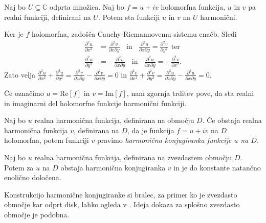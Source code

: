 \documentclass[mat1, tisk]{fmfdelo}
\begin{document}
    \begin{trditev}
        \label{hh}
        Naj bo $U \subseteq \mathbb{C}$ odprta množica. Naj bo $f = u + iv$ holomorfna funkcija, $u$ in $v$ pa realni funkciji, definirani na $U$. Potem sta funkciji $u$ in $v$ na $U$ harmonični.
    \end{trditev}

    \begin{dokaz}
        Ker je $f$ holomorfna, zadošča Cauchy-Riemannovemu sistemu enačb. Sledi
        \begin{align*}
            \frac{\partial^2 u}{\partial x^2} &= \frac{\partial^2 v}{\partial x \partial y}~~~~\text{in}~~~~\frac{\partial^2 u}{\partial x \partial y} = \frac{\partial^2 v}{\partial y^2}~~\text{ter}\\ 
            \frac{\partial^2 u}{\partial y^2} &=  - \frac{\partial^2 v}{\partial x \partial y}~~~~\text{in}~~~~\frac{\partial^2 u}{\partial x \partial y} =  - \frac{\partial^2 v}{\partial x^2}.
        \end{align*}
        Zato velja $\frac{\partial^2 u}{\partial x^2} + \frac{\partial^2 u}{\partial y^2} = \frac{\partial^2 v}{\partial x \partial y} - \frac{\partial^2 v}{\partial x \partial y} =0$ in $\frac{\partial^2 v}{\partial x^2} + \frac{\partial^2 v}{\partial y^2} = \frac{\partial^2 u}{\partial x \partial y} - \frac{\partial^2 u}{\partial x \partial y}=0$.
    \end{dokaz}

    \begin{opomba}
        Če označimo $u = \text{Re}[f]$ in $v = \text{Im}[f]$, nam zgornja trditev pove, da sta realni in imaginarni del holomorfne funkcije harmonični funkciji. 
    \end{opomba}

    \begin{definicija}
        Naj bo $u$ realna harmonična funkcija, definirana na območju $D$. Če obstaja realna harmonična funkcija $v$, definirana na $D$, da je funkcija $f = u + iv$ na $D$ holomorfna, potem funkciji $v$ pravimo \emph{harmonična konjugiranka funkcije $u$ na $D$}.    
    \end{definicija}

    \begin{trditev}
        \label{konj}
        Naj bo $u$ realna harmonična funkcija, definirana na zvezdastem območju $D$. Potem za $u$ na $D$ obstaja harmonična konjugiranka $v$ in je do konstante natančno enolično določena. 
    \end{trditev}
    \begin{dokaz}
        Konstrukcijo harmonične konjugiranke si bralec, za primer ko je zvezdasto območje kar odprt disk, lahko ogleda v \cite[stran 56 in 57]{gamelin}.
        Ideja dokaza za splošno zvezdasto območje je podobna. 
    \end{dokaz}
\end{document}
